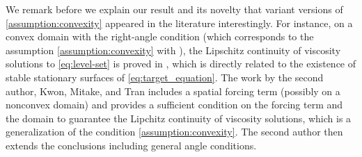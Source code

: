 \documentclass[11pt]{article}
\makeatletter
\numberwithin{equation}{section}
\newcommand{\pOmega}[0]{\partial\Omega}
\newcommand{\sgrad}[0]{\nabla_{\pOmega}}
\def\leq{\leqslant}
\newcounter{mathrecordid}
\newcommand{\mathboxbegin}[1]{%
  \stepcounter{mathrecordid}%
  \immediate\write\mathrecords{\themathrecordid,#1}%
  \special{pdf:bann << /Type /Annot /Subtype /Link /Border [0 0 0]
    /MathBoxID \themathrecordid /F 2
    /A << /S /URI /URI (urn:mathbox:\themathrecordid) >> >>}}
\newcommand{\mathboxinlineplain}[1]{$#1$}
\newcommand{\mathboxinline}[1]{%
  $\mathboxbegin{inline}#1\special{pdf:eann}$}
\newcommand{\recordmath}{%
  \ifmeasuring@\expandafter\mathboxinlineplain
  \else\expandafter\mathboxinline\fi}
\makeatother
\begin{document}



We remark before we explain our result and its novelty that variant versions of \eqref{assumption:convexity} appeared in the literature interestingly. For instance, on a convex domain with the right-angle condition (which corresponds to the assumption \eqref{assumption:convexity} with \recordmath{\beta\equiv0}), the Lipschitz continuity of viscosity solutions to \eqref{eq:level-set} is proved in \cite{GOS99}, which is directly related to the existence of stable stationary surfaces of \eqref{eq:target_equation}.
The work \cite{JKMT22} by the second author, Kwon, Mitake, and Tran includes a spatial forcing term (possibly on a nonconvex domain) and provides a sufficient condition on the forcing term and the domain to guarantee the Lipchitz continuity of viscosity solutions, which is a generalization of the condition \eqref{assumption:convexity}. The second author \cite{J23} then extends the conclusions including general angle conditions.
\end{document}
